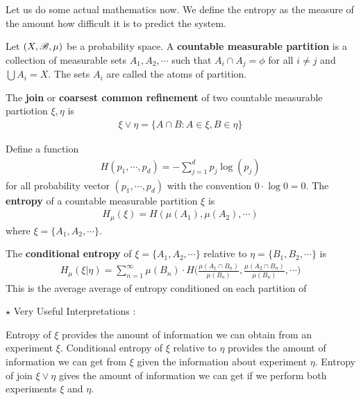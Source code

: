 \documentclass[10pt,a4paper]{report}
\begin{document}
Let us do some actual mathematics now. We define the entropy as the measure of the amount how difficult it is to predict the system.
\s

 Let $(X,\mathscr{B}, \mu)$ be a probability space. A \textbf{countable measurable partition} is a collection of measurable sets $A_1, A_2, \cdots$ such that $A_i \cap A_j =\phi$ for all $i\neq j$ and $\bigcup A_i = X$. The sets $A_i$ are called the atoms of partition. 

\quad The \textbf{join} or \textbf{coarsest common refinement} of two countable measurable partiotion $\xi, \eta$ is
\begin{align*}
\xi \vee \eta = \{A \cap B : A\in \xi, B \in \eta \}
\end{align*}

\quad Define a function
\begin{align*}
H(p_1, \cdots, p_d) = - \sum_{j=1}^d p_j \log (p_j)
\end{align*}
for all probability vector $(p_1, \cdots, p_d)$ with the convention $0 \cdot \log 0 =0$. The \textbf{entropy} of a countable measurable partition $\xi$ is
\begin{align*}
H_{\mu}(\xi) = H(\mu(A_1), \mu(A_2), \cdots)
\end{align*}
where $\xi = \{A_1, A_2, \cdots \}$.

\quad The \textbf{conditional entropy} of $\xi = \{A_1, A_2, \cdots \}$ relative to $\eta = \{B_1, B_2, \cdots \}$ is 
\begin{align*}
H_{\mu} (\xi | \eta) = \sum_{n=1}^{\infty} \mu(B_n) \cdot H\Big( \frac{\mu(A_1 \cap B_n)}{\mu(B_n)},\frac{\mu(A_2 \cap B_n)}{\mu(B_n)},\cdots \Big)
\end{align*}
This is the average average of entropy conditioned on each partition of 
\s

$\star$ Very Useful Interpretations : 

\quad Entropy of $\xi$ provides the amount of information we can obtain from an experiment $\xi$. Conditional entropy of $\xi$ relative to $\eta$ provides the amount of information we can get from $\xi$ given the information about experiment $\eta$. Entropy of join $\xi \vee \eta$ gives the amount of information we can get if we perform both experiments $\xi$ and $\eta$.
\s
\end{document}
